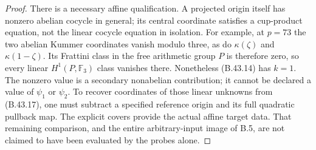 \begin{proof}
There is a necessary affine qualification.  A projected
origin itself has nonzero abelian cocycle in general;
its central coordinate satisfies a cup-product equation,
not the linear cocycle equation in isolation.  For example,
at $p=73$ the two abelian Kummer coordinates vanish modulo
three, as do $\kappa(\zeta)$ and $\kappa(1-\zeta)$.
Its Frattini class in the free arithmetic group $P$ is
therefore zero, so every linear $H^1(P,\mathbb F_3)$
class vanishes there.  Nonetheless (B.43.14) has $k=1$.
The nonzero value is a secondary nonabelian contribution;
it cannot be declared a value of $\psi_1$ or $\psi_2$.
To recover coordinates of those linear unknowns from
(B.43.17), one must subtract a specified reference origin
and its full quadratic pullback map.  The explicit covers
provide the actual affine target data.  That remaining
comparison, and the entire arbitrary-input image of B.5,
are not claimed to have been evaluated by the probes alone.
\end{proof}

